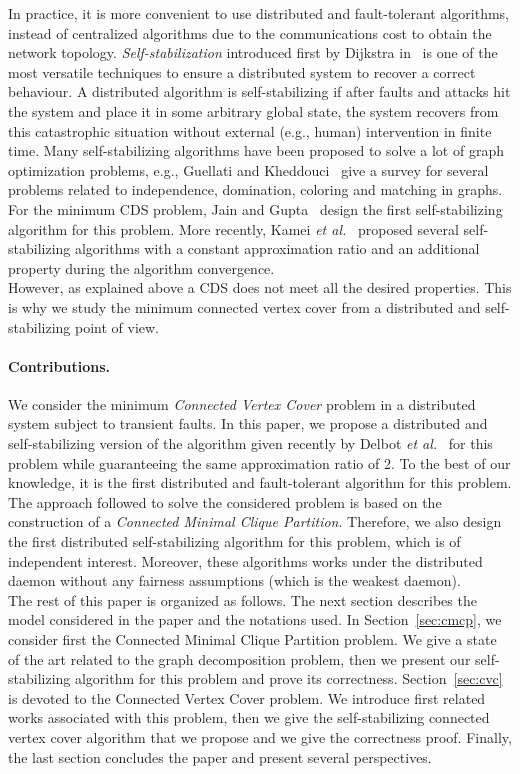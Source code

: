 \documentclass[11pt,letterpaper,onecolumn]{article}
\begin{document}
In practice, it is more convenient to use distributed and fault-tolerant algorithms, instead of centralized algorithms due to the communications cost to obtain the network topology. \emph{Self-stabilization} introduced first by Dijkstra in~\cite{Dijkstra74,Dolev2000} is one of the most versatile techniques to ensure a distributed system to recover a correct behaviour. A distributed algorithm is self-stabilizing if after faults and attacks hit the system and place it in some arbitrary global state, the system recovers from this catastrophic situation without external (e.g., human) intervention in finite time. Many self-stabilizing algorithms have been proposed to solve a lot of graph optimization problems, e.g., Guellati and Kheddouci~\cite{GuellatiK10} give a survey for several problems related to independence, domination, coloring and matching in graphs. For the minimum CDS problem, Jain and Gupta~\cite{JainG05} design the first self-stabilizing algorithm for this problem. More recently, Kamei \emph{et al.}~\cite{KameiK10,KameiK12,KameiIY13} proposed several self-stabilizing algorithms with a constant approximation ratio and an additional property during the algorithm convergence.\\
However, as explained above a CDS does not meet all the desired properties. This is why we study the minimum connected vertex cover from a distributed and self-stabilizing point of view.

\paragraph{Contributions.}
We consider the minimum \emph{Connected Vertex Cover} problem in a distributed system subject to transient faults. In this paper, we propose a distributed and self-stabilizing version of the algorithm given recently by Delbot \emph{et al.}~\cite{DelbotLP13} for this problem while guaranteeing the same approximation ratio of 2. To the best of our knowledge, it is the first distributed and fault-tolerant algorithm for this problem. The approach followed to solve the considered problem is based on the construction of a \emph{Connected Minimal Clique Partition}. Therefore, we also design the first distributed self-stabilizing algorithm for this problem, which is of independent interest. Moreover, these algorithms works under the distributed daemon without any fairness assumptions (which is the weakest daemon).\\

The rest of this paper is organized as follows. The next section describes the model considered in the paper and the notations used. In Section~\ref{sec:cmcp}, we consider first the Connected Minimal Clique Partition problem. We give a state of the art related to the graph decomposition problem, then we present our self-stabilizing algorithm for this problem and prove its correctness. Section~\ref{sec:cvc} is devoted to the Connected Vertex Cover problem. We introduce first related works associated with this problem, then we give the self-stabilizing connected vertex cover algorithm that we propose and we give the correctness proof. Finally, the last section concludes the paper and present several perspectives.
\end{document}
